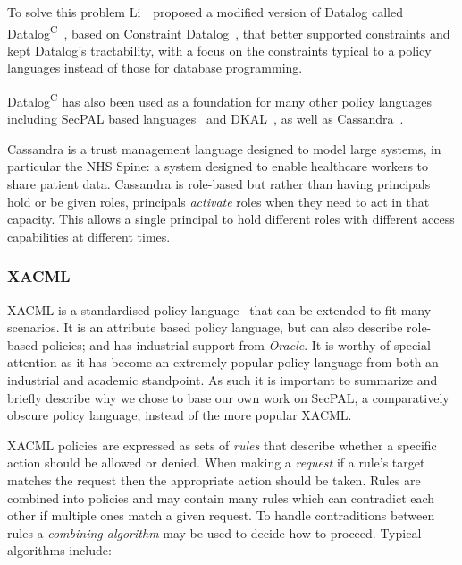 \documentclass[thesis.tex]{subfiles}
\begin{document}
To solve this problem Li~\etal{}~proposed a modified version of
Datalog called Datalog\textsuperscript{C}~\cite{li_datalog_2003},
based on Constraint
Datalog~\cite{revesz_constraint_1995,revesz_safe_1998}, that better
supported constraints and kept Datalog's tractability, with a focus on
the constraints typical to a policy languages instead of those for
database programming.

Datalog\textsuperscript{C} has also been used as a foundation for many
other policy languages including SecPAL based
languages~\cite{aziz_secpal4dsa:_2011,becker_secpal:_2010,becker_framework_2009,hallett_apppal_2016}
and DKAL~\cite{gurevich_dkal:_2008}, as well as
Cassandra~\cite{becker_cassandra:_2004}.

Cassandra is a trust management language designed to model large
systems, in particular the NHS Spine: a system designed to enable
healthcare workers to share patient data.  Cassandra is role-based but
rather than having principals hold or be given roles, principals
\emph{activate} roles when they need to act in that capacity.  This
allows a single principal to hold different roles with different
access capabilities at different times. 


\subsubsection{XACML}

XACML is a standardised policy language~\cite{oasis_extensible_2013}
that can be extended to fit many scenarios. It is an attribute based
policy language, but can also describe role-based policies; and has
industrial support from \emph{Oracle}.  It is worthy of special
attention as it has become an extremely popular policy language from
both an industrial and academic standpoint.  As such it is important
to summarize and briefly describe why we chose to base our own work on
SecPAL, a comparatively obscure policy language, instead of the more
popular XACML.

XACML policies are expressed as sets of \emph{rules} that describe
whether a specific action should be allowed or denied. When making a
\emph{request} if a rule's target matches the request then the
appropriate action should be taken. Rules are combined into policies
and may contain many rules which can contradict each other if multiple
ones match a given request. To handle contraditions between rules a
\emph{combining algorithm} may be used to decide how to
proceed. Typical algorithms include:
\end{document}
